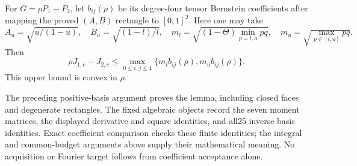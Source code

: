 \begin{lemma}\label{j:local:entry201:central}
For $G=\rho P_1-P_2$, let $b_{ij}(\rho)$ be its degree-four tensor
Bernstein coefficients after mapping the proved $(A,B)$ rectangle to
$[0,1]^2$. Here one may take
\[
 A_u=\sqrt{u/(1-u)},\quad B_u=\sqrt{(1-l)/l},\quad
 m_l=\sqrt{(1-\Theta)\min_{p=l,u}pq},\quad
 m_u=\sqrt{\max_{p\in[l,u]}pq}.
\]
Then
\[
 \rho J_{1,c}-J_{2,c}\le
 \max_{0\le i,j\le4}\{m_l b_{ij}(\rho),m_u b_{ij}(\rho)\}.
\]
This upper bound is convex in $\rho$.
\end{lemma}
The preceding positive-basis argument proves the lemma, including closed
faces and degenerate rectangles. The fixed algebraic objects record the
seven moment matrices, the displayed derivative and square identities,
and all25 inverse basis identities. Exact coefficient comparison checks
these finite identities; the integral and common-budget arguments above
supply their mathematical meaning. No acquisition or Fourier target
follows from coefficient acceptance alone.
